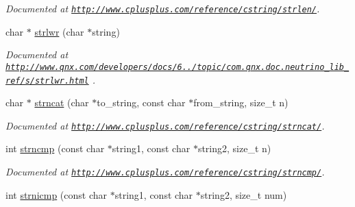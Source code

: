 \begin{DoxyCompactItemize}
\begin{DoxyCompactList}\small\item\em Documented at \href{http://www.cplusplus.com/reference/cstring/strlen/}{\tt http\-://www.\-cplusplus.\-com/reference/cstring/strlen/}. \end{DoxyCompactList}\item 
\hypertarget{group__string_ga8405a432a671b51cc350ba62d5525c5a}{char $\ast$ \hyperlink{group__string_ga8405a432a671b51cc350ba62d5525c5a}{strlwr} (char $\ast$string)}\label{group__string_ga8405a432a671b51cc350ba62d5525c5a}

\begin{DoxyCompactList}\small\item\em Documented at \href{http://www.qnx.com/developers/docs/6.5.0/topic/com.qnx.doc.neutrino_lib_ref/s/strlwr.html}{\tt http\-://www.\-qnx.\-com/developers/docs/6../topic/com.\-qnx.\-doc.\-neutrino\-\_\-lib\-\_\-ref/s/strlwr.\-html} . \end{DoxyCompactList}\item 
\hypertarget{group__string_ga4b19a5035b747785f6f97caebd893fc8}{char $\ast$ \hyperlink{group__string_ga4b19a5035b747785f6f97caebd893fc8}{strncat} (char $\ast$to\-\_\-string, const char $\ast$from\-\_\-string, size\-\_\-t n)}\label{group__string_ga4b19a5035b747785f6f97caebd893fc8}

\begin{DoxyCompactList}\small\item\em Documented at \href{http://www.cplusplus.com/reference/cstring/strncat/}{\tt http\-://www.\-cplusplus.\-com/reference/cstring/strncat/}. \end{DoxyCompactList}\item 
\hypertarget{group__string_ga9df1bbeeede6e085028295bdce89835e}{int \hyperlink{group__string_ga9df1bbeeede6e085028295bdce89835e}{strncmp} (const char $\ast$string1, const char $\ast$string2, size\-\_\-t n)}\label{group__string_ga9df1bbeeede6e085028295bdce89835e}

\begin{DoxyCompactList}\small\item\em Documented at \href{http://www.cplusplus.com/reference/cstring/strncmp/}{\tt http\-://www.\-cplusplus.\-com/reference/cstring/strncmp/}. \end{DoxyCompactList}\item 
\hypertarget{group__string_ga82046863ea74c18140c90748426a2a57}{int \hyperlink{group__string_ga82046863ea74c18140c90748426a2a57}{strnicmp} (const char $\ast$string1, const char $\ast$string2, size\-\_\-t num)}\label{group__string_ga82046863ea74c18140c90748426a2a57}


\end{DoxyCompactItemize}
